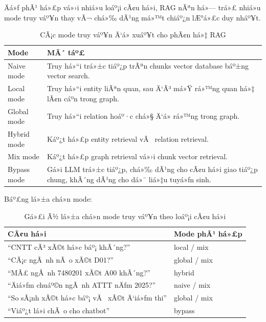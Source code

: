 ﻿\documentclass[12pt,a4paper]{report}
\begin{document}
Äá»ƒ phÃ¹ há»£p vá»›i nhiá»u loáº¡i cÃ¢u há»i, RAG nÃªn há»— trá»£ nhiá»u mode truy váº¥n thay vÃ¬ chá»‰ dÃ¹ng má»™t chiáº¿n lÆ°á»£c duy nháº¥t.

\begin{table}[H]
\centering
\begin{tabular}{|p{3.2cm}|p{9.6cm}|}
\hline
\textbf{Mode} & \textbf{MÃ´ táº£} \\
\hline
Naive mode & Truy há»“i trá»±c tiáº¿p trÃªn chunks vector database báº±ng vector search. \\
\hline
Local mode & Truy há»“i entity liÃªn quan, sau Ä‘Ã³ má»Ÿ rá»™ng quan há»‡ lÃ¢n cáº­n trong graph. \\
\hline
Global mode & Truy há»“i relation hoáº·c chá»§ Ä‘á» rá»™ng trong graph. \\
\hline
Hybrid mode & Káº¿t há»£p entity retrieval vÃ  relation retrieval. \\
\hline
Mix mode & Káº¿t há»£p graph retrieval vá»›i chunk vector retrieval. \\
\hline
Bypass mode & Gá»i LLM trá»±c tiáº¿p, chá»‰ dÃ¹ng cho cÃ¢u há»i giao tiáº¿p chung, khÃ´ng dÃ¹ng cho dá»¯ liá»‡u tuyá»ƒn sinh. \\
\hline
\end{tabular}
\caption{CÃ¡c mode truy váº¥n Ä‘á» xuáº¥t cho phÃ¢n há»‡ RAG}
\label{tab:rag-query-modes}
\end{table}

Báº£ng lá»±a chá»n mode:

\begin{table}[H]
\centering
\begin{tabular}{|p{6cm}|p{6.8cm}|}
\hline
\textbf{CÃ¢u há»i} & \textbf{Mode phÃ¹ há»£p} \\
\hline
``CNTT cÃ³ xÃ©t há»c báº¡ khÃ´ng?'' & local / mix \\
\hline
``CÃ¡c ngÃ nh nÃ o xÃ©t D01?'' & global / mix \\
\hline
``MÃ£ ngÃ nh 7480201 xÃ©t A00 khÃ´ng?'' & hybrid \\
\hline
``Äiá»ƒm chuáº©n ngÃ nh ATTT nÄƒm 2025?'' & naive / mix \\
\hline
``So sÃ¡nh xÃ©t há»c báº¡ vÃ  xÃ©t Ä‘iá»ƒm thi'' & global / mix \\
\hline
``Viáº¿t lá»i chÃ o cho chatbot'' & bypass \\
\hline
\end{tabular}
\caption{Gá»£i Ã½ lá»±a chá»n mode truy váº¥n theo loáº¡i cÃ¢u há»i}
\label{tab:rag-mode-selection}
\end{table}
\end{document}
